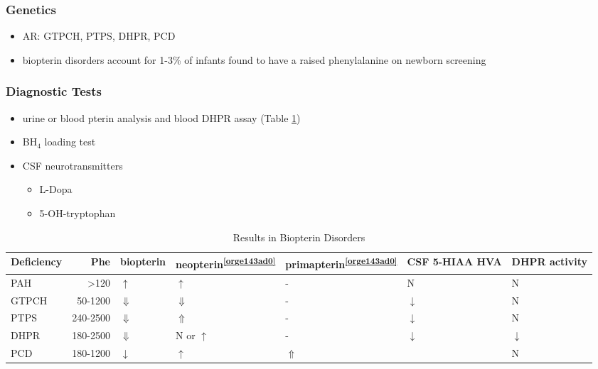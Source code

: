 \documentclass{scrartcl}
\begin{document}
\subsubsection{Genetics}
\label{sec:orgbf28883}
\begin{itemize}
\item AR: GTPCH, PTPS, DHPR, PCD
\item biopterin disorders account for 1-3\% of infants found to have a
raised phenylalanine on newborn screening
\end{itemize}

\subsubsection{Diagnostic Tests}
\label{sec:org4d7031c}
\begin{itemize}
\item urine or blood pterin analysis and blood DHPR assay (Table \ref{tab:org429be61})
\item BH\(_{\text{4}}\) loading test
\item CSF neurotransmitters
\begin{itemize}
\item L-Dopa
\item 5-OH-tryptophan
\end{itemize}
\end{itemize}

\begin{table}[htbp]
\caption{\label{tab:org429be61}
Results in Biopterin Disorders}
\centering
\begin{tabular}{lrlllll}
Deficiency & Phe & biopterin\footnotemark & neopterin\textsuperscript{\ref{orge143ad0}} & primapterin\textsuperscript{\ref{orge143ad0}} & CSF 5-HIAA HVA & DHPR activity\\
\hline
PAH & \textgreater{}120 & \(\uparrow\) & \(\uparrow\) & - & N & N\\
GTPCH & 50-1200 & \(\Downarrow\) & \(\Downarrow\) & - & \(\downarrow\) & N\\
PTPS & 240-2500 & \(\Downarrow\) & \(\Uparrow\) & - & \(\downarrow\) & N\\
DHPR & 180-2500 & \(\Downarrow\) & N or \(\uparrow\) & - & \(\downarrow\) & \(\downarrow\)\\
PCD & 180-1200 & \(\downarrow\) & \(\uparrow\) & \(\Uparrow\) &  & N\\
\end{tabular}
\end{table}
\end{document}
